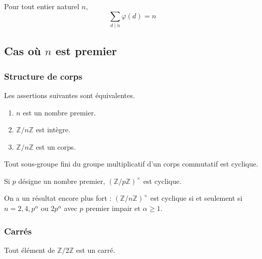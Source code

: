 	\begin{proposition}
	  Pour tout entier naturel $n$,
		\[ \sum_{d \mid n} \varphi(d) = n \]
	\end{proposition}

	\subsection{Cas où \texorpdfstring{$n$}{n} est premier}

	\subsubsection{Structure de corps}

	\begin{proposition}
		Les assertions suivantes sont équivalentes.
		\begin{enumerate}[label=(\roman*)]
			\item $n$ est un nombre premier.
			\item $\mathbb{Z}/n\mathbb{Z}$ est intègre.
			\item $\mathbb{Z}/n\mathbb{Z}$ est un corps.
		\end{enumerate}
	\end{proposition}


	\begin{theorem}
		Tout sous-groupe fini du groupe multiplicatif d'un corps commutatif est cyclique.
	\end{theorem}

	\begin{corollary}
		Si $p$ désigne un nombre premier, $(\mathbb{Z}/p\mathbb{Z})^\times$ est cyclique.
	\end{corollary}


	\begin{remark}
		On a un résultat encore plus fort : $(\mathbb{Z}/n\mathbb{Z})^\times$ est cyclique si et seulement si $n = 2, 4, p^\alpha \text{ ou } 2p^\alpha$ avec $p$ premier impair et $\alpha \geq 1$.
	\end{remark}

	\subsubsection{Carrés}


	\begin{remark}
		Tout élément de $\mathbb{Z}/2\mathbb{Z}$ est un carré.
	\end{remark}

